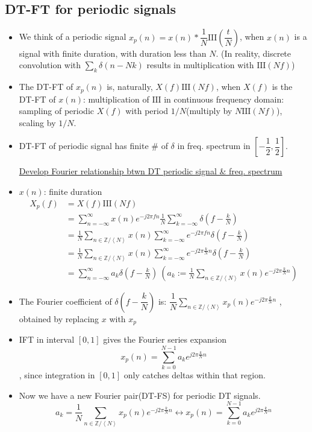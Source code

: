 \documentclass{article}
\begin{document}
\subsection{DT-FT for periodic signals}
\begin{itemize}
    \item We think of a periodic signal $x_p(n)=x(n)*\dfrac{1}{N}\mathrm{III}\left(\dfrac{t}{N}\right)$, when $x(n)$ is a signal with finite duration, with duration less than $N$. (In reality, discrete convolution with $\sum_{k}\delta(n-Nk)$ results in multiplication with $\mathrm{III}(Nf)$)
    
    \item The DT-FT of $x_p(n)$ is, naturally, $X(f)\mathrm{III}(Nf)$, when $X(f)$ is the DT-FT of $x(n)$: multiplication of $\mathrm{III}$ in continuous frequency domain: sampling of periodic $X(f)$ with period $1/N$(multiply by $N\mathrm{III}(Nf)$), scaling by $1/N$.
    
    \item DT-FT of periodic signal has finite \# of $\delta$ in freq. spectrum in $\left[-\dfrac{1}{2}, \dfrac{1}{2}\right]$.
    
    \underline{Develop Fourier relationship btwn DT periodic signal \& freq. spectrum}
    
    \item $x(n)$: finite duration
    \begin{align*}
        X_p(f)&=X(f)\mathrm{III}(Nf)\\
              &=\sum_{n=-\infty}^{\infty}{x(n)e^{-j2\pi fn}}\frac{1}{N}\sum_{k=-\infty}^{\infty}{\delta\left(f-\frac{k}{N}\right)}\\
              &=\frac{1}{N}\sum_{n\in\mathbb{Z}/\left<N\right>}x(n)\sum_{k=-\infty}^{\infty}{e^{-j2\pi fn}\delta\left(f-\frac{k}{N}\right)}\\
              &=\frac{1}{N}\sum_{n\in\mathbb{Z}/\left<N\right>}x(n)\sum_{k=-\infty}^{\infty}{e^{-j2\pi \frac{k}{N}n}\delta\left(f-\frac{k}{N}\right)}\\
              &=\sum_{n=-\infty}^{\infty}{a_k\delta\left(f-\frac{k}{N}\right)}\:(a_k:=\frac{1}{N}\sum_{n\in\mathbb{Z}/\left<N\right>}x(n)e^{-j2\pi \frac{k}{N}n})
    \end{align*}
    \item The Fourier coefficient of $\delta\left(f-\dfrac{k}{N}\right)$ is: $\dfrac{1}{N}\displaystyle\sum_{n\in\mathbb{Z}/\left<N\right>}{x_p(n)e^{-j2\pi\frac{k}{N}n}}$
    , obtained by replacing $x$ with $x_p$
    \item IFT in interval $[0,1]$ gives the Fourier series expansion
    \[x_p(n)=\sum_{k=0}^{N-1}{a_ke^{j2\pi\frac{k}{N}n}}\], since integration in $[0,1]$ only catches deltas within that region.
    
    \item Now we have a new Fourier pair(DT-FS) for periodic DT signals.
    \[a_k=\dfrac{1}{N}\displaystyle\sum_{n\in\mathbb{Z}/\left<N\right>}{x_p(n)e^{-j2\pi\frac{k}{N}n}}\leftrightarrow x_p(n)=\sum_{k=0}^{N-1}{a_ke^{j2\pi\frac{k}{N}n}}\]
\end{itemize}
\end{document}
